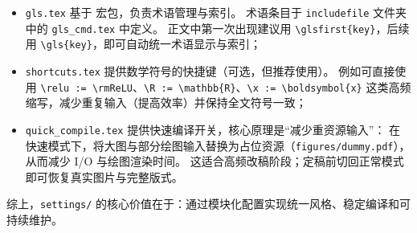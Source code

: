 \begin{itemize}
  \item \texttt{gls.tex} 基于  宏包，负责术语管理与索引。
  术语条目于 \texttt{includefile} 文件夹中的 \texttt{gls\_cmd.tex} 中定义。
  正文中第一次出现建议用 \texttt{\textbackslash glsfirst\{key\}}，后续用 \texttt{\textbackslash gls\{key\}}，即可自动统一术语显示与索引；
  \item \texttt{shortcuts.tex} 提供数学符号的快捷键（可选，但推荐使用）。
  例如可直接使用 \texttt{\textbackslash relu := \textbackslash rm{ReLU}}、\texttt{\textbackslash R := \textbackslash mathbb\{R\}}、\texttt{\textbackslash x := \textbackslash boldsymbol\{x\}} 这类高频缩写，减少重复输入（提高效率）并保持全文符号一致；
  \item \texttt{quick\_compile.tex} 提供快速编译开关，核心原理是“减少重资源输入”：
  在快速模式下，将大图与部分绘图输入替换为占位资源（\texttt{figures/dummy.pdf}），从而减少 I/O 与绘图渲染时间。
  这适合高频改稿阶段；定稿前切回正常模式即可恢复真实图片与完整版式。
\end{itemize}

综上，\texttt{settings/} 的核心价值在于：通过模块化配置实现统一风格、稳定编译和可持续维护。
